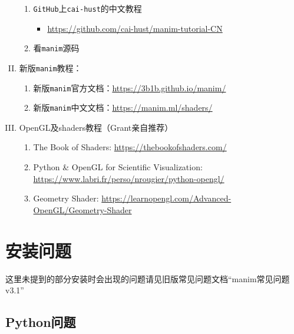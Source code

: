 \documentclass[cn,blue,14pt,normal]{elegantnote}
\begin{document}
\begin{enumerate}[I.]
\begin{enumerate}[1.]
		\item \texttt{GitHub}上\texttt{cai-hust}的中文教程
		\begin{itemize}
			\item \url{https://github.com/cai-hust/manim-tutorial-CN}
		\end{itemize}
	
		\item 看\texttt{manim}源码
	\end{enumerate}

	\item 新版\texttt{manim}教程：
	
	\begin{enumerate}[1.]
		\item 新版\texttt{manim}官方文档：\url{https://3b1b.github.io/manim/}
		
		\item 新版\texttt{manim}中文文档：\url{https://manim.ml/shaders/}
	\end{enumerate}

	\item OpenGL及shaders教程（Grant亲自推荐）
	\begin{enumerate}[1.]
		\item The Book of Shaders: \url{https://thebookofshaders.com/}
		
		\item Python \& OpenGL for Scientific Visualization: \url{https://www.labri.fr/perso/nrougier/python-opengl/}
		
		\item Geometry Shader: \url{https://learnopengl.com/Advanced-OpenGL/Geometry-Shader}
	\end{enumerate}
\end{enumerate}

\newpage

\tableofcontents

\newpage

\section{安装问题}

\begin{note}
	这里未提到的部分安装时会出现的问题请见旧版常见问题文档“manim常见问题v3.1”
\end{note}

\subsection{Python问题}
\end{document}

